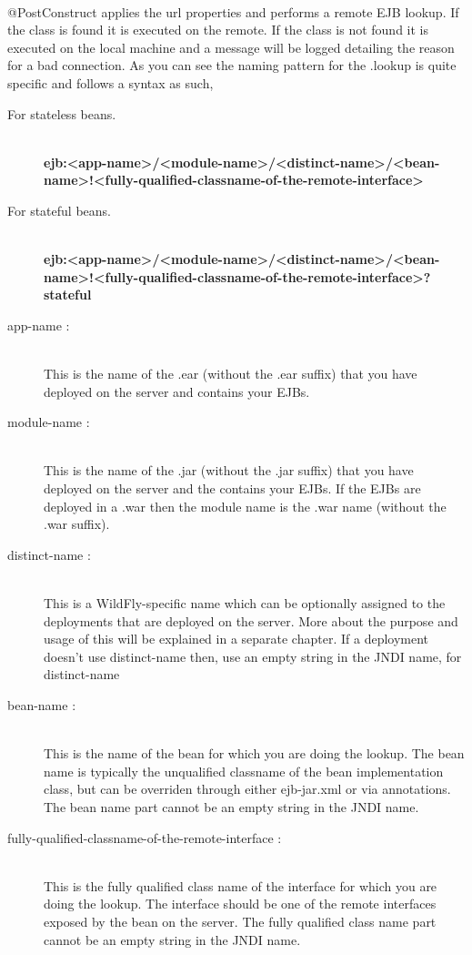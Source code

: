 \documentclass[
10pt, %
letterpaper, %
oneside, %
headinclude,footinclude, %
BCOR5mm, %
]{scrartcl}
\begin{document}
\paragraph{} @PostConstruct applies the url properties and performs a remote EJB lookup. If the class is found it is executed on the remote. If the class is not found it is executed on the local machine and a message will be logged detailing the reason for a bad connection. As you can see the naming pattern for the .lookup is quite specific and follows a syntax as such,
\begin{description}
\item[For stateless beans.] \hfill \\
\textbf{
ejb:<app-name>/<module-name>/<distinct-name>/<bean-name>!<fully-qualified-classname-of-the-remote-interface>}
\item[For stateful beans.] \hfill \\
\textbf{
ejb:<app-name>/<module-name>/<distinct-name>/<bean-name>!<fully-qualified-classname-of-the-remote-interface>?stateful}
\item[app-name :] \hfill \\
This is the name of the .ear (without the .ear suffix) that you have deployed on the server and contains your EJBs.
\item[module-name :] \hfill \\
This is the name of the .jar (without the .jar suffix) that you have deployed on the server and the contains your EJBs. If the EJBs are deployed in a .war then the module name is the .war name (without the .war suffix).
\item[distinct-name :] \hfill \\
This is a WildFly-specific name which can be optionally assigned to the deployments that are deployed on the server. More about the purpose and usage of this will be explained in a separate chapter. If a deployment doesn't use distinct-name then, use an empty string in the JNDI name, for distinct-name
\item[bean-name :] \hfill \\
This is the name of the bean for which you are doing the lookup. The bean name is typically the unqualified classname of the bean implementation class, but can be overriden through either ejb-jar.xml or via annotations. The bean name part cannot be an empty string in the JNDI name.
\item[fully-qualified-classname-of-the-remote-interface :] \hfill \\
This is the fully qualified class name of the interface for which you are doing the lookup. The interface should be one of the remote interfaces exposed by the bean on the server. The fully qualified class name part cannot be an empty string in the JNDI name.
\end{description}
\end{document}
